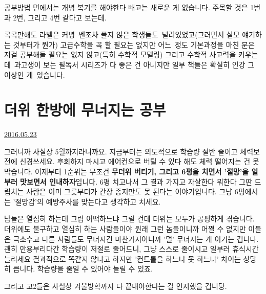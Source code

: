 공부방법 면에서는 개념 복기를 해야한다 빼고는 새로운 게 없습니다.
주목할 것은 1번과 2번, 그리고 4번 같다고 보는데.
\vspace{5mm}

콕콕만해도 라벨은 커녕 쎈조차 풀지 않은 학생들도 널려있었고(그러면서 실모 얘기하는 것부터가 뭔가)
고급수학을 꼭 할 필요는 없지만 어느 정도 기본과정을 마친 분은 저걸 공부해둘 필요는 없지 않고(특히 수학적 모델링)
그리고 수학적 사고력을 키우는 데 과고생이 보는 필독서 시리즈가 다 좋은 건 아니지만 일부 책들은 확실히 인강 그 이상인 게 있습니다.
\vspace{5mm}



\section{더위 한방에 무너지는 공부}
\href{https://www.kockoc.com/Apoc/789055}{2016.05.23}

\vspace{5mm}

그러니까 사실상 5월까지라니까요.
지금부터는 의도적으로 학습량 절반 줄이고 체력보전에 신경쓰세요. 후회하지 마시고
에어컨으로 버틸 수 있다 해도 체력 떨어지는 건 못 막습니다.
이제부터 1순위는 무조건 \textbf{무더위 버티기, 그리고 6평을 치면서 '절망'을 일부러 맛보면서 인내하자}입니다.
6평 치고나서 그 결과 가지고 자살한다 뭐한다 그딴 드립치는 사람은 이미 그릇부터가 간장 종지만도 못 된다는 이야기입니다.
그냥 6평에서는 '절망감'의 예방주사를 맞는다고 생각하고 치세요.
\vspace{5mm}

남들은 열심히 하는데 그럼 어떡하느냐 그럴 건데 더위는 모두가 공평하게 겪습니다.
더위에도 불구하고 열심히 하는 사람들이야 원래 그런 놈들이니까 어쩔 수 없지만 이들은 극소수고
다른 사람들도 무너지긴 마찬가지이니까 '덜' 무너지는 게 이기는 겁니다.
괜히 만용부리다간 학습량이 저절로 줄어드니, 그냥 스스로 줄이시고 일부러 휴식시간 늘리세요
결과적으로 똑같지 않냐고 하지만 '컨트롤을 하느냐 못 하느냐' 차이는 상당히 큽니다.
학습량을 줄일 수 있어야 늘릴 수 있죠.
\vspace{5mm}

그리고 고2들은 사실상 겨울방학까지 다 끝내야한다는 걸 인지했을 겁니당.
\vspace{5mm}

